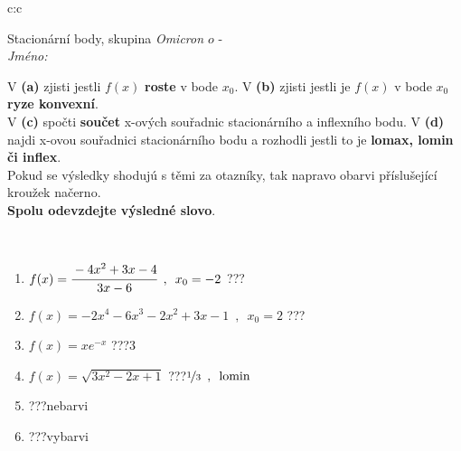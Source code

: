 \documentclass[10pt]{report}
\newcommand\omicron{o}
\begin{document}
\newpage
\thispagestyle{empty}
\begin{tabular}{c:c}
\begin{minipage}[c][104.5mm][t]{0.5\linewidth}
\begin{center}
\vspace{7mm}
{\huge Stacionární body, skupina \textit{Omicron $\omicron$} -}\\[5mm]
\textit{Jméno:}\phantom{xxxxxxxxxxxxxxxxxxxxxxxxxxxxxxxxxxxxxxxxxxxxxxxxxxxxxxxxxxxxxxxxx}\\[5mm]
\begin{minipage}{0.95\linewidth}
\begin{center}
{\small V \textbf{(a)} zjisti jestli $f(x)$ \textbf{roste} v bode $x_0$. V \textbf{(b)} zjisti jestli je $f(x)$ v bode $x_0$ \textbf{ryze konvexní}.\\V \textbf{(c)} spočti \textbf{součet} x-ových souřadnic stacionárního a inflexního bodu. V \textbf{(d)} najdi x-ovou souřadnici stacionárního bodu a rozhodli jestli to je \textbf{lomax, lomin či inflex}.\\Pokud se výsledky shodujú s těmi za otazníky, tak napravo obarvi příslušející kroužek načerno.\\\textbf{Spolu odevzdejte výsledné slovo}}.
\end{center}
\end{minipage}
\\[1mm]
\begin{minipage}{0.79\linewidth}
\begin{center}
\begin{varwidth}{\linewidth}
\begin{enumerate}
\normalsize
\item $f(x)=\cfrac{-4x^2+3x-4}{3x-6}\enspace , \enspace x_0=-2$\quad \dotfill\; ???\;\dotfill \quad {}
\item $f(x)=-2x^4-6x^3-2x^2+3x-1\enspace , \enspace x_0=2$\quad \dotfill\; ???\;\dotfill \quad {}
\item $f(x)=xe^{-x}$\quad \dotfill\; ???\;\dotfill \quad $3$
\item $f(x)=\sqrt{3x^2-2x+1}$\quad \dotfill\; ???\;\dotfill \quad $\nicefrac{1}{3}\enspace , \enspace \mathrm{lomin}$
\item \quad \dotfill\; ???\;\dotfill \quad nebarvi
\item \quad \dotfill\; ???\;\dotfill \quad vybarvi
\end{enumerate}
\end{varwidth}
\end{center}

\end{minipage}
\end{center}
\end{minipage}
\end{tabular}
\end{document}
